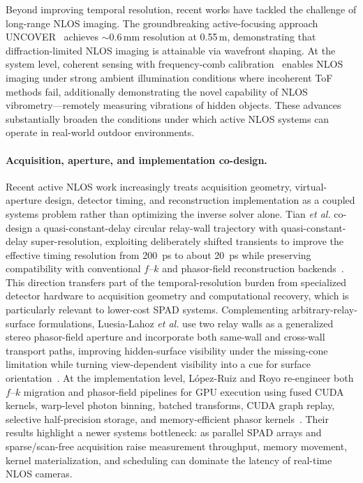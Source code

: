 Beyond improving temporal resolution, recent works have tackled the challenge of long-range NLOS imaging. The groundbreaking active-focusing approach UNCOVER~\cite{caohighresolutionnlos2022} achieves $\sim0.6\,\text{mm}$ resolution at 0.55\,m, demonstrating that diffraction-limited NLOS imaging is attainable via wavefront shaping. At the system level, coherent sensing with frequency-comb calibration~\cite{huangCoherentNLOS2024} enables NLOS imaging under strong ambient illumination conditions where incoherent ToF methods fail, additionally demonstrating the novel capability of NLOS vibrometry---remotely measuring vibrations of hidden objects. These advances substantially broaden the conditions under which active NLOS systems can operate in real-world outdoor environments.

\paragraph{Acquisition, aperture, and implementation co-design.}
Recent active NLOS work increasingly treats acquisition geometry, virtual-aperture design, detector timing, and reconstruction implementation as a coupled systems problem rather than optimizing the inverse solver alone. Tian \textit{et al.} co-design a quasi-constant-delay circular relay-wall trajectory with quasi-constant-delay super-resolution, exploiting deliberately shifted transients to improve the effective timing resolution from 200~ps to about 20~ps while preserving compatibility with conventional $f$--$k$ and phasor-field reconstruction backends~\cite{tianQCDCQSRNLOS2026}. This direction transfers part of the temporal-resolution burden from specialized detector hardware to acquisition geometry and computational recovery, which is particularly relevant to lower-cost SPAD systems. Complementing arbitrary-relay-surface formulations, Luesia-Lahoz \textit{et al.} use two relay walls as a generalized stereo phasor-field aperture and incorporate both same-wall and cross-wall transport paths, improving hidden-surface visibility under the missing-cone limitation while turning view-dependent visibility into a cue for surface orientation~\cite{luesiaStereoNLOS2026}. At the implementation level, L\'opez-Ruiz and Royo re-engineer both $f$--$k$ migration and phasor-field pipelines for GPU execution using fused CUDA kernels, warp-level photon binning, batched transforms, CUDA graph replay, selective half-precision storage, and memory-efficient phasor kernels~\cite{lopezruizMemoryEfficientGPUNLOS2026}. Their results highlight a newer systems bottleneck: as parallel SPAD arrays and sparse/scan-free acquisition raise measurement throughput, memory movement, kernel materialization, and scheduling can dominate the latency of real-time NLOS cameras.
